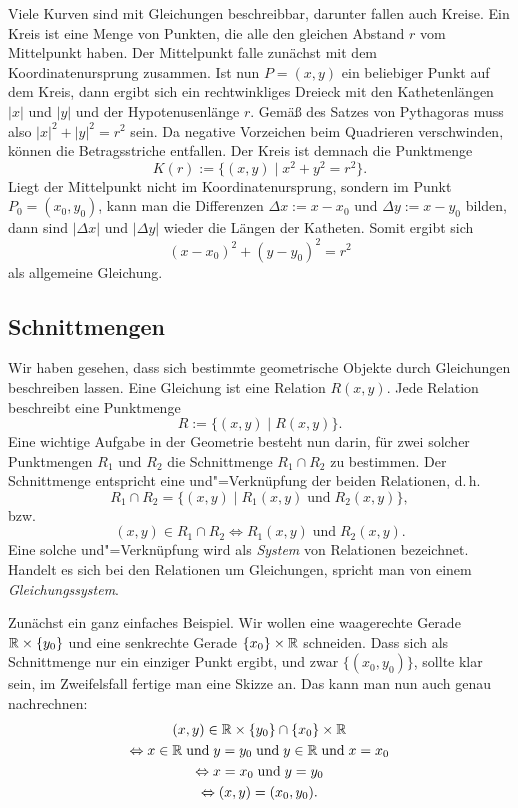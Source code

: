 Viele Kurven sind mit Gleichungen beschreibbar, darunter fallen
auch Kreise. Ein Kreis ist eine Menge von Punkten, die alle
den gleichen Abstand $r$ vom Mittelpunkt haben. Der Mittelpunkt
falle zunächst mit dem Koordinatenursprung zusammen. Ist nun
$P=(x,y)$ ein beliebiger Punkt auf dem Kreis, dann ergibt sich
ein rechtwinkliges Dreieck mit den Kathetenlängen $|x|$ und $|y|$
und der Hypotenusenlänge $r$. Gemäß des Satzes von Pythagoras
muss also $|x|^2+|y|^2=r^2$ sein. Da negative Vorzeichen beim
Quadrieren verschwinden, können die Betragsstriche entfallen.
Der Kreis ist demnach die Punktmenge%
\[K(r) := \{(x,y)\mid x^2+y^2=r^2\}.\]
Liegt der Mittelpunkt nicht im Koordinatenursprung, sondern im
Punkt $P_0=(x_0,y_0)$, kann man die Differenzen $\Delta x := x-x_0$
und $\Delta y := x-y_0$ bilden, dann sind $|\Delta x|$ und $|\Delta y|$
wieder die Längen der Katheten. Somit ergibt sich%
\begin{equation}\label{eq:Kreis-allgemein}
(x-x_0)^2+(y-y_0)^2=r^2
\end{equation}
als allgemeine Gleichung.

\subsection{Schnittmengen}

Wir haben gesehen, dass sich bestimmte geometrische Objekte durch
Gleichungen beschreiben lassen. Eine Gleichung ist eine Relation
$R(x,y)$. Jede Relation beschreibt eine Punktmenge%
\[R := \{(x,y)\mid R(x,y)\}.\]
Eine wichtige Aufgabe in der Geometrie besteht nun darin, für
zwei solcher Punktmengen $R_1$ und $R_2$ die Schnittmenge
$R_1\cap R_2$ zu bestimmen. Der Schnittmenge entspricht
eine und"=Verknüpfung der beiden Relationen, d.\,h.%
\[R_1\cap R_2 = \{(x,y)\mid R_1(x,y)\;\text{und}\; R_2(x,y)\},\]
bzw.
\[(x,y)\in R_1\cap R_2 \Leftrightarrow R_1(x,y)\;\text{und}\; R_2(x,y).\]
Eine solche und"=Verknüpfung wird als \emph{System} von
Relationen bezeichnet. Handelt es sich bei den Relationen um
Gleichungen, spricht man von einem \emph{Gleichungssystem}.

Zunächst ein ganz einfaches Beispiel. Wir wollen eine waagerechte
Gerade $\mathbb R\times\{y_0\}$ und eine senkrechte Gerade $\{x_0\}\times\mathbb R$
schneiden. Dass sich als Schnittmenge nur ein einziger Punkt ergibt,
und zwar $\{(x_0,y_0)\}$, sollte klar sein, im Zweifelsfall fertige
man eine Skizze an. Das kann man nun auch
genau nachrechnen:%
\begin{gather*}
(x,y)\in\mathbb R\times\{y_0\}\cap \{x_0\}\times\mathbb R\\
\Leftrightarrow x\in\mathbb R\;\text{und}\; y=y_0
\;\text{und}\;y\in\mathbb R\;\text{und}\;x=x_0\\
\Leftrightarrow x=x_0\;\text{und}\;y=y_0\\
\Leftrightarrow (x,y)=(x_0,y_0).
\end{gather*}

